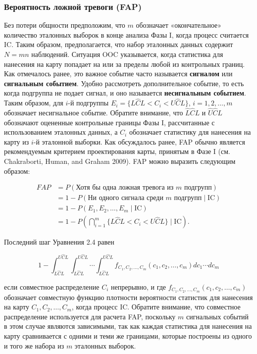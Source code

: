 \subsubsection{Вероятность ложной тревоги (FAP)}
Без потери общности предположим, что \(m\) обозначает «окончательное» количество эталонных выборок в конце анализа Фазы I, когда процесс считается IC. Таким образом, предполагается, что набор эталонных данных содержит \(N = mn\) наблюдений. Ситуация OOC указывается, когда статистика для нанесения на карту попадает на или за пределы любой из контрольных границ. Как отмечалось ранее, это важное событие часто называется \textbf{сигналом} или \textbf{сигнальным событием}. Удобно рассмотреть дополнительное событие, то есть когда подгруппа не подает сигнал, и оно называется \textbf{несигнальным событием}. Таким образом, для \(i\)-й подгруппы \(E_i = \{L\hat{C}L < C_i < U\hat{C}L\}\), \(i = 1, 2, \ldots, m\) обозначает несигнальное событие. Обратите внимание, что \(\hat{L}\hat{C}L\) и \(\hat{U}\hat{C}L\) обозначают оцененные контрольные границы Фазы I, рассчитанные с использованием эталонных данных, а \(C_i\) обозначает статистику для нанесения на карту из \(i\)-й эталонной выборки. Как обсуждалось ранее, FAP обычно является рекомендуемым критерием проектирования карты, принятым в Фазе I (см. Chakraborti, Human, and Graham 2009). FAP можно выразить следующим образом:

\begin{equation}
	\begin{aligned}
		FAP &= P(\text{Хотя бы одна ложная тревога из } m \text{ подгрупп}) \\
		&= 1 - P(\text{Ни одного сигнала среди } m \text{ подгрупп} \mid \text{IC}) \\
		&= 1 - P(E_1, E_2, \ldots, E_m \mid \text{IC}) \\
		&= 1 - P\left(\bigcap_{i=1}^m \{L\hat{C}L < C_i < U\hat{C}L\} \mid \text{IC}\right).
	\end{aligned}
	\label{eq:2.4}
\end{equation}

Последний шаг Уравнения 2.4 равен

\[
1 - \int_{L\hat{C}L}^{U\hat{C}L} \int_{L\hat{C}L}^{U\hat{C}L} \cdots \int_{L\hat{C}L}^{U\hat{C}L} f_{C_1, C_2, \ldots, C_m}(c_1, c_2, \ldots, c_m) dc_1 \cdots dc_m
\]

если совместное распределение \(C_i\) непрерывно, и где \(f_{C_1, C_2, \ldots, C_m}(c_1, c_2, \ldots, c_m)\) обозначает совместную функцию плотности вероятности статистик для нанесения на карту \(C_1, C_2, \ldots, C_m\), когда процесс IC. Обратите внимание, что совместное распределение используется для расчета FAP, поскольку \(m\) сигнальных событий в этом случае являются зависимыми, так как каждая статистика для нанесения на карту сравнивается с одними и теми же границами, которые построены из одного и того же набора из \(m\) эталонных выборок.


